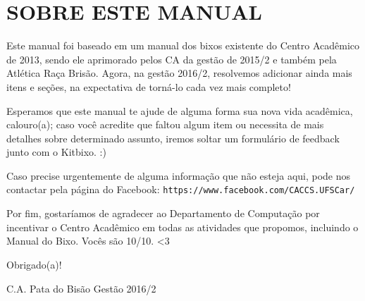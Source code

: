 \section{SOBRE ESTE MANUAL}
Este manual foi baseado em um manual dos bixos existente do Centro Acadêmico de 2013, sendo ele aprimorado pelos CA da gestão de 2015/2 e também pela Atlética Raça Brisão. Agora, na gestão 2016/2, resolvemos adicionar ainda mais itens e seções, na expectativa de torná-lo cada vez mais completo!

Esperamos que este manual te ajude de alguma forma sua nova vida acadêmica, calouro(a); caso você acredite que faltou algum item ou necessita de mais detalhes sobre determinado assunto, iremos soltar um formulário de feedback junto com o Kitbixo. :)

Caso precise urgentemente de alguma informação que não esteja aqui, pode nos contactar pela página do Facebook: \texttt{https://www.facebook.com/CACCS.UFSCar/}

Por fim, gostaríamos de agradecer ao Departamento de Computação por incentivar o Centro Acadêmico em todas as atividades que propomos, incluindo o Manual do Bixo. Vocês são 10/10. <3

\begin{flushright}
  Obrigado(a)!

  C.A. Pata do Bisão Gestão 2016/2
\end{flushright}
